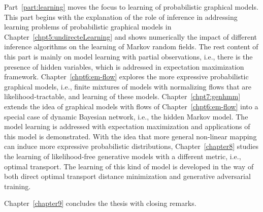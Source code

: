 Part~\ref{part:learning} moves the focus to learning of probabilistic graphical models. This part begins with the explanation of the role of inference in addressing learning problems of probabilistic graphical models in Chapter~\ref{chpt5:undirecteLearning} and shows numerically the impact of different inference algorithms on the learning of Markov random fields. The rest content of this part is mainly on model learning with partial observations, i.e., there is the presence of hidden variables, which is addressed in expectation maximization framework. Chapter~\ref{chpt6:em-flow} explores the more expressive probabilistic graphical models, i.e., finite mixtures of models with normalizing flows that are likelihood-tractable, and learning of these models. Chapter~\ref{chpt7:genhmm} extends the idea of graphical models with flows of Chapter~\ref{chpt6:em-flow} into a special case of dynamic Bayesian network, i.e., the hidden Markov model. The model learning is addressed with expectation maximization and applications of this model is demonstrated. With the idea that more general non-linear mapping can induce more expressive probabilistic distributions, Chapter~\ref{chapter8} studies the learning of likelihood-free generative models with a different metric, i.e., optimal transport. The learning of this kind of model is developed in the way of both direct optimal transport distance minimization and generative adversarial training.

Chapter~\ref{chapter9} concludes the thesis with closing remarks.
